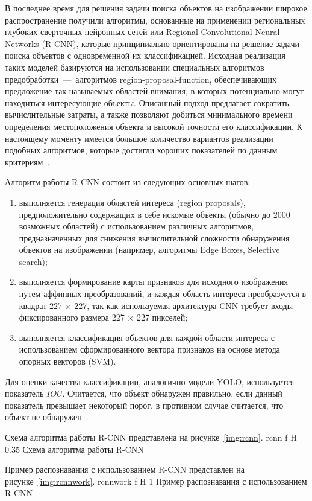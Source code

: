 В последнее время для решения задачи поиска объектов на изображении широкое распространение получили алгоритмы, основанные на применении региональных глубоких сверточных нейронных сетей или Regional Convolutional Neural Networks (R-CNN), которые принципиально ориентированы на решение задачи поиска объектов с одновременной их классификацией.
Исходная реализация таких моделей базируются на использовании специальных алгоритмов предобработки~---~алгоритмов region-proposal-function, обеспечивающих предложение так называемых областей внимания, в которых потенциально могут находиться интересующие объекты.
Описанный подход предлагает сократить вычислительные затраты, а также позволяют добиться минимального времени определения местоположения объекта и высокой точности его классификации.
К настоящему моменту имеется большое количество вариантов реализации подобных алгоритмов, которые достигли хороших показателей по данным критериям~\cite{rcnn}.

Алгоритм работы R-CNN состоит из следующих основных шагов:
\begin{enumerate}
	\item выполняется генерация областей интереса (region proposals), предположительно содержащих в себе искомые объекты (обычно до 2000 возможных областей) с использованием различных алгоритмов, предназначенных для снижения вычислительной сложности обнаружения объектов на изображении (например, алгоритмы Edge Boxes, Selective search);
	\item выполняется формирование карты признаков для исходного изображения путем аффинных преобразований, и каждая область интереса преобразуется в квадрат 227 $\times$ 227,	так как используемая архитектура CNN требует входы фиксированного размера 227 $\times$ 227	пикселей;
	\item выполняется классификация объектов для каждой области интереса с использованием сформированного вектора признаков на основе метода опорных векторов (SVM).
\end{enumerate}
Для оценки качества классификации, аналогично модели YOLO, используется показатель $IOU$.
Считается, что объект обнаружен правильно, если данный показатель превышает некоторый порог, в противном случае считается, что объект не обнаружен~\cite{yolochina, rcnn}.

\clearpage
Схема алгоритма работы R-CNN представлена на рисунке~\ref{img:rcnn}.
	{rcnn}
	{f}
	{H}
	{0.35\textwidth}
	{Схема алгоритма работы R-CNN}

Пример распознавания с использованием R-CNN представлен на рисунке~\ref{img:rcnnwork}.
	{rcnnwork}
	{f}
	{H}
	{1\textwidth}
	{Пример распознавания с использованием R-CNN}

